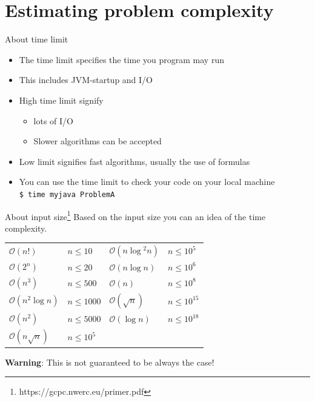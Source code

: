 \documentclass[11pt,pdf, aspectratio=169]{beamer}
\begin{document}
  \section{Estimating problem complexity}
  \begin{frame}{About time limit}
    \begin{itemize}
      \item The time limit specifies the time you program may run
      \item This includes JVM-startup and I/O
      \item High time limit signify \begin{itemize}
                                      \item lots of I/O
                                      \item Slower algorithms can be accepted
      \end{itemize}
      \item Low limit signifies fast algorithms, usually the use of formulas
      \item You can use the time limit to check your code on your local machine\\ \texttt{\$ time myjava ProblemA}
    \end{itemize}
  \end{frame}
  \begin{frame}{About input size\footnote[1]{https://gcpc.nwerc.eu/primer.pdf}}
    Based on the input size you can an idea of the time complexity.

    \begin{center}
      \begin{tabular}{llll}
        \hline
        $\mathcal{O}(n!)$         & $n \leq 10$   & $\mathcal{O}(n\log{}^{2}n)$ & $n \leq 10^5$    \\
        $\mathcal{O}(2^n)$        & $n \leq 20$   & $\mathcal{O}(n\log{}n)$     & $n \leq 10^6$    \\
        $\mathcal{O}(n^3)$        & $n \leq 500$  & $\mathcal{O}(n)$            & $n \leq 10^8$    \\
        $\mathcal{O}(n^2\log{}n)$ & $n \leq 1000$ & $\mathcal{O}(\sqrt{n})$     & $n \leq 10^{15}$ \\
        $\mathcal{O}(n^2)$        & $n \leq 5000$ & $\mathcal{O}(\log{}n)$      & $n \leq 10^{18}$ \\
        $\mathcal{O}(n\sqrt {n})$ & $n \leq 10^5$ &                             &                  \\
        \hline
      \end{tabular}
    \end{center}

    \textbf{Warning}: This is not guaranteed to be always the case!
  \end{frame}
\end{document}
